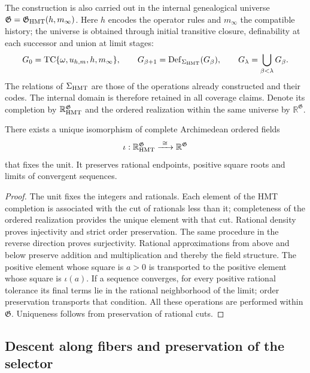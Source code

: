The construction is also carried out in the internal genealogical universe \(\mathfrak G=\mathfrak G_{\rm HMT}(h,m_\infty)\). Here \(h\) encodes the operator rules and \(m_\infty\) the compatible history; the universe is obtained through initial transitive closure, definability at each successor and union at limit stages:
\[
 G_0=\operatorname{TC}\{\omega,u_{h,m},h,m_\infty\},\qquad
 G_{\beta+1}=\operatorname{Def}_{\Sigma_{\rm HMT}}(G_\beta),\qquad
 G_\lambda=\bigcup_{\beta<\lambda}G_\beta .
\]
The relations of \(\Sigma_{\rm HMT}\) are those of the operations already constructed and their codes. The internal domain is therefore retained in all coverage claims. Denote its completion by \(\mathbb R_{\rm HMT}^{\mathfrak G}\) and the ordered realization within the same universe by \(\mathbb R^{\mathfrak G}\).

\begin{proposition}
\label{hmtfg:carta-interna}
There exists a unique isomorphism of complete Archimedean ordered fields
\[
 \iota:\mathbb R_{\rm HMT}^{\mathfrak G}
             \xrightarrow{\ \cong\ }\mathbb R^{\mathfrak G}
\]
that fixes the unit. It preserves rational endpoints, positive square roots and limits of convergent sequences.
\end{proposition}
\begin{proof}
The unit fixes the integers and rationals. Each element of the HMT completion is associated with the cut of rationals less than it; completeness of the ordered realization provides the unique element with that cut. Rational density proves injectivity and strict order preservation. The same procedure in the reverse direction proves surjectivity. Rational approximations from above and below preserve addition and multiplication and thereby the field structure. The positive element whose square is \(a>0\) is transported to the positive element whose square is \(\iota(a)\). If a sequence converges, for every positive rational tolerance its final terms lie in the rational neighborhood of the limit; order preservation transports that condition. All these operations are performed within \(\mathfrak G\). Uniqueness follows from preservation of rational cuts.
\end{proof}

\subsection{Descent along fibers and preservation of the selector}
\label{hmtfg:descenso-selector}

